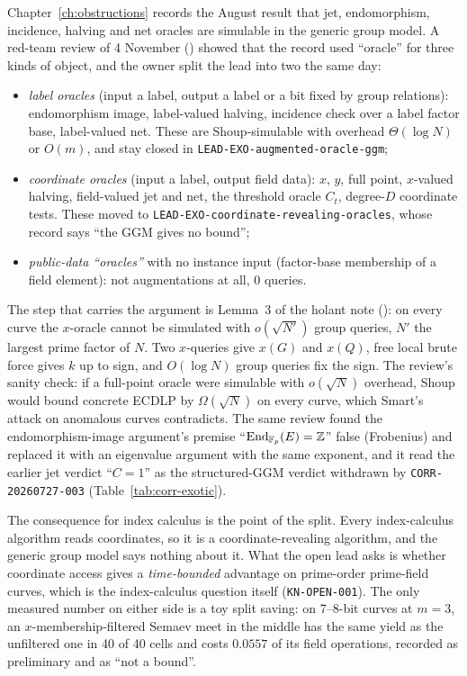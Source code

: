 Chapter~\ref{ch:obstructions} records the August result that jet,
endomorphism, incidence, halving and net oracles are simulable in the
generic group model. A red-team review of 4 November
()
showed that the record used ``oracle'' for three kinds of object, and the
owner split the lead into two the same day:
\begin{itemize}
\item \emph{label oracles} (input a label, output a label or a bit fixed by
  group relations): endomorphism image, label-valued halving, incidence
  check over a label factor base, label-valued net. These are Shoup-simulable
  with overhead $\Theta(\log N)$ or $O(m)$, and stay closed in
  \texttt{LEAD-EXO-augmented-oracle-ggm};
\item \emph{coordinate oracles} (input a label, output field data):
  $x$, $y$, full point, $x$-valued halving, field-valued jet and net, the
  threshold oracle $C_t$, degree-$D$ coordinate tests. These moved to
  \texttt{LEAD-EXO-coordinate-revealing-oracles}, whose record says ``the GGM
  gives no bound'';
\item \emph{public-data ``oracles''} with no instance input (factor-base
  membership of a field element): not augmentations at all, 0 queries.
\end{itemize}
The step that carries the argument is Lemma~3 of the holant note
():
on every curve the $x$-oracle cannot be simulated with $o(\sqrt{N'})$ group
queries, $N'$ the largest prime factor of $N$. Two $x$-queries give $x(G)$
and $x(Q)$, free local brute force gives $k$ up to sign, and $O(\log N)$
group queries fix the sign. The review's sanity check: if a full-point
oracle were simulable with $o(\sqrt N)$ overhead, Shoup would bound concrete
ECDLP by $\Omega(\sqrt N)$ on every curve, which Smart's attack on anomalous
curves contradicts. The same review found the endomorphism-image argument's
premise ``$\mathrm{End}_{\mathbb{F}_p}(E)=\mathbb{Z}$'' false (Frobenius) and replaced it with
an eigenvalue argument with the same exponent, and it read the earlier jet
verdict ``$C=1$'' as the structured-GGM verdict withdrawn by
\texttt{CORR-20260727-003} (Table~\ref{tab:corr-exotic}).

The consequence for index calculus is the point of the split. Every
index-calculus algorithm reads coordinates, so it is a
coordinate-revealing algorithm, and the generic group model says nothing
about it. What the open lead asks is whether coordinate access gives a
\emph{time-bounded} advantage on prime-order prime-field curves, which is
the index-calculus question itself (\texttt{KN-OPEN-001}). The only
measured number on either side is a toy split saving: on 7--8-bit curves at
$m=3$, an $x$-membership-filtered Semaev meet in the middle has the same
yield as the unfiltered one in 40 of 40 cells and costs $0.0557$ of its field
operations, recorded as preliminary and as ``not a bound''.

